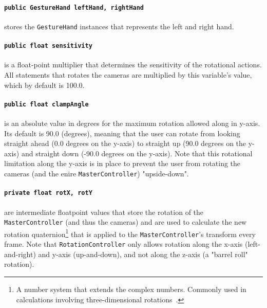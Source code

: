 \paragraph{\texttt{public GestureHand leftHand, rightHand}}stores the \texttt{GestureHand} instances that represents the left and right hand.

\paragraph{\texttt{public float sensitivity}}is a float-point multiplier that determines the sensitivity of the rotational actions. 
                                             All statements that rotates the cameras are multiplied by this variable's value, which by default is 100.0.

\paragraph{\texttt{public float clampAngle}}is an absolute value in degrees for the maximum rotation allowed along in y-axis. 
                                            Its default is 90.0 (degrees), meaning that the user can rotate from looking straight ahead (0.0 degrees on the y-axis) to 
                                            straight up (90.0 degrees on the y-axis) and straight down (-90.0 degrees on the y-axis). Note that this rotational 
                                            limitation along the y-axis is in place to prevent the user from rotating the cameras (and the enire \texttt{MasterController}) 
                                            "upside-down". %

\paragraph{\texttt{private float rotX, rotY}}are intermediate floatpoint values that store the rotation of the \texttt{MasterController} (and thus the
                                              cameras) and are used to calculate the new rotation quaternion\footnote{A number system that extends the complex numbers. 
                                              Commonly used in calculations involving three-dimensional rotations~\citep{Kunze2004}.} 
                                              that is applied to the \texttt{MasterController}'s transform 
                                              every frame. Note that \texttt{RotationController} only allows rotation
                                              along the x-axis (left-and-right) and y-axis (up-and-down), and not along the z-axis (a "barrel roll" rotation). 

